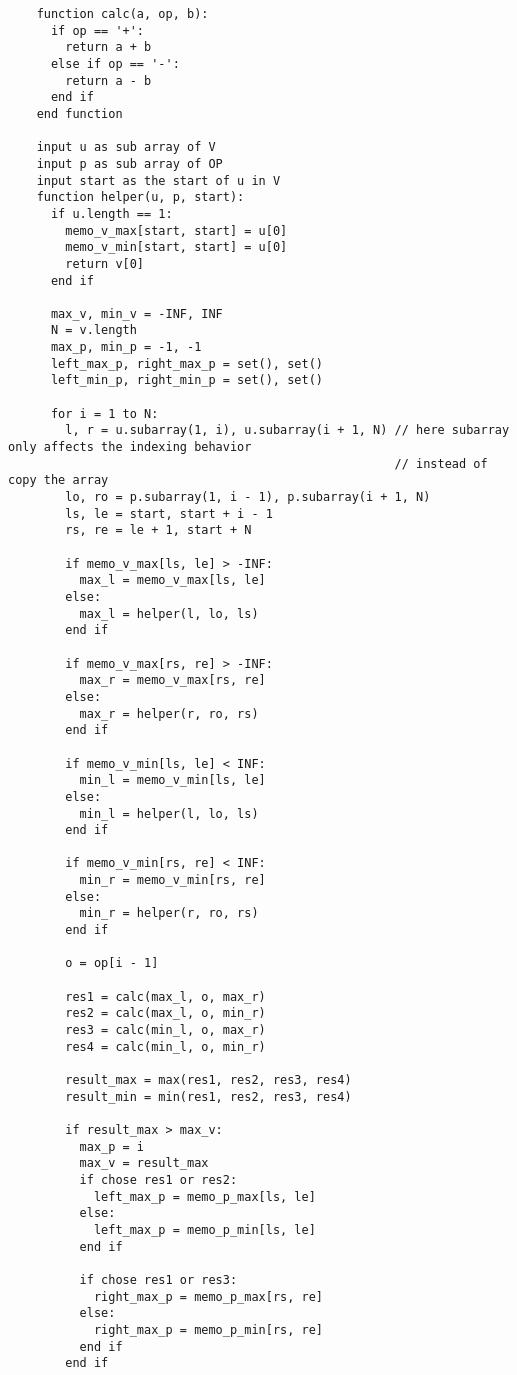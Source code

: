 \documentclass{article}
\begin{document}
\begin{enumerate}[topsep=0pt]
\begin{verbatim}
    function calc(a, op, b):
      if op == '+':
        return a + b
      else if op == '-':
        return a - b
      end if
    end function

    input u as sub array of V
    input p as sub array of OP
    input start as the start of u in V
    function helper(u, p, start):
      if u.length == 1:
        memo_v_max[start, start] = u[0]
        memo_v_min[start, start] = u[0]
        return v[0]
      end if

      max_v, min_v = -INF, INF
      N = v.length
      max_p, min_p = -1, -1
      left_max_p, right_max_p = set(), set()
      left_min_p, right_min_p = set(), set()

      for i = 1 to N:
        l, r = u.subarray(1, i), u.subarray(i + 1, N) // here subarray only affects the indexing behavior
                                                      // instead of copy the array
        lo, ro = p.subarray(1, i - 1), p.subarray(i + 1, N)
        ls, le = start, start + i - 1
        rs, re = le + 1, start + N

        if memo_v_max[ls, le] > -INF:
          max_l = memo_v_max[ls, le]
        else:
          max_l = helper(l, lo, ls)
        end if

        if memo_v_max[rs, re] > -INF:
          max_r = memo_v_max[rs, re]
        else:
          max_r = helper(r, ro, rs)
        end if

        if memo_v_min[ls, le] < INF:
          min_l = memo_v_min[ls, le]
        else:
          min_l = helper(l, lo, ls)
        end if

        if memo_v_min[rs, re] < INF:
          min_r = memo_v_min[rs, re]
        else:
          min_r = helper(r, ro, rs)
        end if

        o = op[i - 1]

        res1 = calc(max_l, o, max_r)
        res2 = calc(max_l, o, min_r)
        res3 = calc(min_l, o, max_r)
        res4 = calc(min_l, o, min_r)

        result_max = max(res1, res2, res3, res4)
        result_min = min(res1, res2, res3, res4)

        if result_max > max_v:
          max_p = i
          max_v = result_max
          if chose res1 or res2:
            left_max_p = memo_p_max[ls, le]
          else:
            left_max_p = memo_p_min[ls, le]
          end if

          if chose res1 or res3:
            right_max_p = memo_p_max[rs, re]
          else:
            right_max_p = memo_p_min[rs, re]
          end if
        end if


\end{verbatim}
\end{enumerate}
\end{document}
